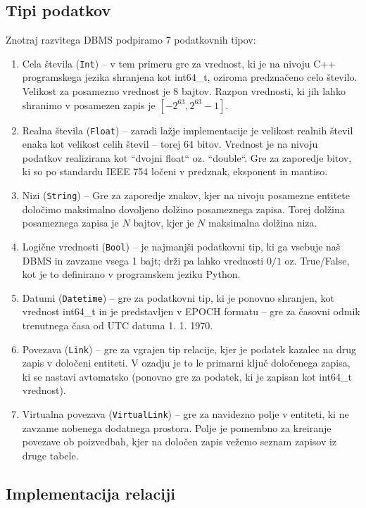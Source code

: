 \documentclass[a4paper,12pt,openright]{book}
\begin{document}
        \subsection{Tipi podatkov}
        Znotraj razvitega DBMS podpiramo 7 podatkovnih tipov:
        \begin{enumerate}
            \item Cela števila ({\tt Int}) – v tem primeru gre za vrednost, ki je na nivoju C++ programskega jezika shranjena kot int64\_t, oziroma predznačeno celo število. Velikost za posamezno vrednost je 8 bajtov. Razpon vrednosti, ki jih lahko shranimo v posamezen zapis je $[-2^{63}, 2^{63} - 1]$.
            \item Realna števila ({\tt Float}) – zaradi lažje implementacije je velikost realnih števil enaka kot velikost celih števil – torej 64 bitov. Vrednost je na nivoju podatkov realizirana kot ``dvojni float`` oz. ``double``. Gre za zaporedje bitov, ki so po standardu IEEE 754 \cite{kahan1996ieee} ločeni v predznak, eksponent in mantiso.
            \item Nizi ({\tt String}) – Gre za zaporedje znakov, kjer na nivoju posamezne entitete določimo maksimalno dovoljeno dolžino posameznega zapisa. Torej dolžina posameznega zapisa je $N$ bajtov, kjer je $N$ maksimalna dolžina niza.
            \item Logične vrednosti ({\tt Bool}) – je najmanjši podatkovni tip, ki ga vsebuje naš DBMS in zavzame vsega 1 bajt; drži pa lahko vrednosti $0/1$ oz. True/False, kot je to definirano v programskem jeziku Python.
            \item Datumi ({\tt Datetime}) – gre za podatkovni tip, ki je ponovno shranjen, kot vrednost int64\_t in je predstavljen v EPOCH formatu \cite{EPOCH_FORMAT} – gre za časovni odmik trenutnega časa od UTC datuma 1. 1. 1970. 
            \item Povezava ({\tt Link}) – gre za vgrajen tip relacije, kjer je podatek kazalec na drug zapis v določeni entiteti. V ozadju je to le primarni ključ določenega zapisa, ki se nastavi avtomatsko (ponovno gre za podatek, ki je zapisan kot int64\_t vrednost).
            \item Virtualna povezava ({\tt VirtualLink}) – gre za navidezno polje v entiteti, ki ne zavzame nobenega dodatnega prostora. Polje je pomembno za kreiranje povezave ob poizvedbah, kjer na določen zapis vežemo seznam zapisov iz druge tabele.  
        \end{enumerate}
        
        \subsection{Implementacija relaciji}
\end{document}
